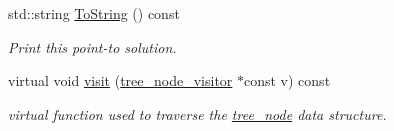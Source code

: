 \begin{DoxyCompactItemize}
std\+::string \hyperlink{structPointToSolution_aeba7648bc2e0bd50c597fefbb2534399}{To\+String} () const
\begin{DoxyCompactList}\small\item\em Print this point-\/to solution. \end{DoxyCompactList}\item 
virtual void \hyperlink{structPointToSolution_afc598575443b8e2e105d17ea84d0de01}{visit} (\hyperlink{classtree__node__visitor}{tree\+\_\+node\+\_\+visitor} $\ast$const v) const
\begin{DoxyCompactList}\small\item\em virtual function used to traverse the \hyperlink{classtree__node}{tree\+\_\+node} data structure. \end{DoxyCompactList}\end{DoxyCompactItemize}
